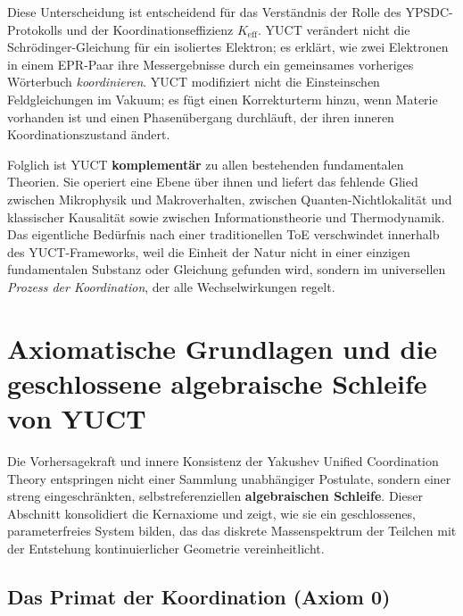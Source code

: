 \documentclass[11pt,a4paper]{article}
\begin{document}
	Diese Unterscheidung ist entscheidend für das Verständnis der Rolle des YPSDC-Protokolls und der Koordinationseffizienz \(K_{\mathrm{eff}}\). YUCT verändert nicht die Schrödinger-Gleichung für ein isoliertes Elektron; es erklärt, wie zwei Elektronen in einem EPR-Paar ihre Messergebnisse durch ein gemeinsames vorheriges Wörterbuch \emph{koordinieren}. YUCT modifiziert nicht die Einsteinschen Feldgleichungen im Vakuum; es fügt einen Korrekturterm hinzu, wenn Materie vorhanden ist und einen Phasenübergang durchläuft, der ihren inneren Koordinationszustand ändert.
	
	Folglich ist YUCT \textbf{komplementär} zu allen bestehenden fundamentalen Theorien. Sie operiert eine Ebene über ihnen und liefert das fehlende Glied zwischen Mikrophysik und Makroverhalten, zwischen Quanten-Nichtlokalität und klassischer Kausalität sowie zwischen Informationstheorie und Thermodynamik. Das eigentliche Bedürfnis nach einer traditionellen ToE verschwindet innerhalb des YUCT-Frameworks, weil die Einheit der Natur nicht in einer einzigen fundamentalen Substanz oder Gleichung gefunden wird, sondern im universellen \emph{Prozess der Koordination}, der alle Wechselwirkungen regelt.
	
	
	\section{Axiomatische Grundlagen und die geschlossene algebraische Schleife von YUCT}
	\label{sec:axiomatic-foundations}
	
	Die Vorhersagekraft und innere Konsistenz der Yakushev Unified Coordination Theory entspringen nicht einer Sammlung unabhängiger Postulate, sondern einer streng eingeschränkten, selbstreferenziellen \textbf{algebraischen Schleife}. Dieser Abschnitt konsolidiert die Kernaxiome und zeigt, wie sie ein geschlossenes, parameterfreies System bilden, das das diskrete Massenspektrum der Teilchen mit der Entstehung kontinuierlicher Geometrie vereinheitlicht.
	
	\subsection{Das Primat der Koordination (Axiom 0)}
	\label{subsec:axiom0}
	
\end{document}

